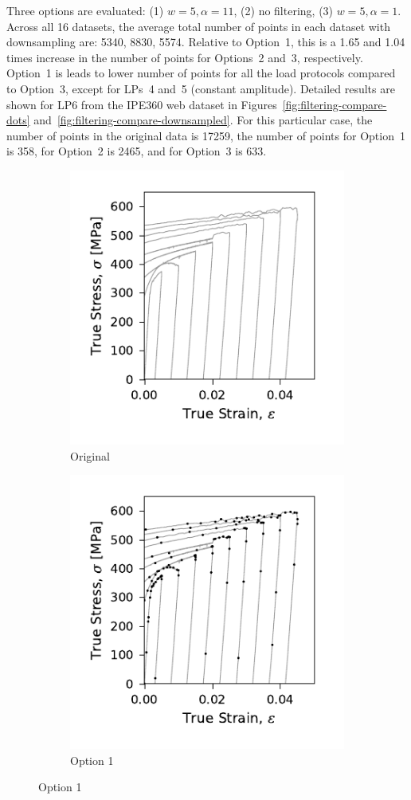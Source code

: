 \documentclass[a4paper,11pt]{article}
\begin{document}
Three options are evaluated: (1) $w = 5, \alpha = 11$, (2) no filtering, (3) $w = 5, \alpha = 1$.
Across all 16 datasets, the average total number of points in each dataset with downsampling are: 5340, 8830, 5574.
Relative to Option~1, this is a 1.65 and 1.04 times increase in the number of points for Options~2 and~3, respectively.
Option~1 is leads to lower number of points for all the load protocols compared to Option~3, except for LPs~4 and~5 (constant amplitude).
Detailed results are shown for LP6 from the IPE360 web dataset in Figures~\ref{fig:filtering-compare-dots} and~\ref{fig:filtering-compare-downsampled}.
For this particular case, the number of points in the original data is 17259, the number of points for Option~1 is 358, for Option~2 is 2465, and for Option~3 is 633.


\begin{figure}
    \centering
    \begin{subfigure}[b]{0.49\linewidth}
        \centering
        \includegraphics{LP6_dots_WP3_IPE360_C_CRM8_nodots_.pdf}
        \caption{Original}
    \end{subfigure}
    \begin{subfigure}[b]{0.49\linewidth}
        \centering
        \includegraphics{LP6_dots_WP3_IPE360_C_CRM8_op1_.pdf}
        \caption{Option 1}
    \end{subfigure}


\end{figure}
\end{document}
